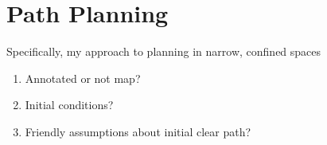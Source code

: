 \section{Path Planning}

Specifically, my approach to planning in narrow, confined spaces

\begin{enumerate}
\item Annotated or not map?
\item Initial conditions?
\item Friendly assumptions about initial clear path?
\end{enumerate}

